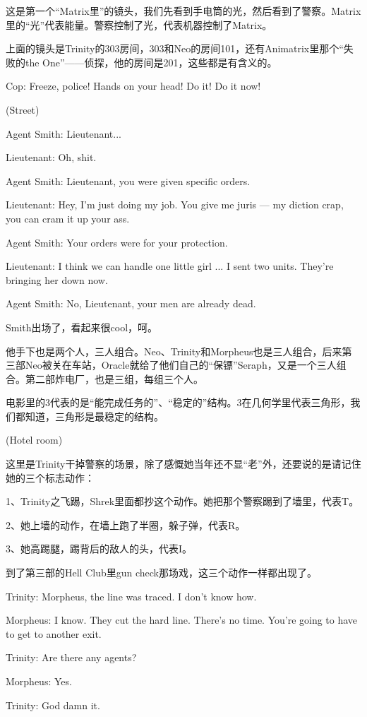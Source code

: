 \documentclass{ctexart}
\newenvironment{myquote}{\color{green} \setlength{\leftskip}{6em} \setlength{\rightskip}{4em} \setlength{\parindent}{-2em}}{\par}
\begin{document}
这是第一个“Matrix里”的镜头，我们先看到手电筒的光，然后看到了警察。Matrix里的“光”代表能量。警察控制了光，代表机器控制了Matrix。

上面的镜头是Trinity的303房间，303和Neo的房间101，还有Animatrix里那个“失败的the One”——侦探，他的房间是201，这些都是有含义的。

\begin{myquote}
Cop: Freeze, police! Hands on your head! Do it! Do it now!

(Street)

Agent Smith: Lieutenant...

Lieutenant: Oh, shit.

Agent Smith: Lieutenant, you were given specific orders.

Lieutenant: Hey, I'm just doing my job. You give me juris --- my diction crap, you can cram it up your ass.

Agent Smith: Your orders were for your protection.

Lieutenant: I think we can handle one little girl ... I sent two units. They're bringing her down now.

Agent Smith: No, Lieutenant, your men are already dead.
\end{myquote}

Smith出场了，看起来很cool，呵。

他手下也是两个人，三人组合。Neo、Trinity和Morpheus也是三人组合，后来第三部Neo被关在车站，Oracle就给了他们自己的“保镖”Seraph，又是一个三人组合。第二部炸电厂，也是三组，每组三个人。

电影里的3代表的是“能完成任务的”、“稳定的”结构。3在几何学里代表三角形，我们都知道，三角形是最稳定的结构。

\begin{myquote}
(Hotel room)
\end{myquote}

这里是Trinity干掉警察的场景，除了感慨她当年还不显“老”外，还要说的是请记住她的三个标志动作：

1、Trinity之飞踢，Shrek里面都抄这个动作。她把那个警察踢到了墙里，代表T。

2、她上墙的动作，在墙上跑了半圈，躲子弹，代表R。

3、她高踢腿，踢背后的敌人的头，代表I。

到了第三部的Hell Club里gun check那场戏，这三个动作一样都出现了。

\begin{myquote}
Trinity: Morpheus, the line was traced. I don't know how.

Morpheus: I know. They cut the hard line. There's no time. You're going to have to get to another exit.

Trinity: Are there any agents?

Morpheus: Yes.

Trinity: God damn it.
\end{myquote}
\end{document}

